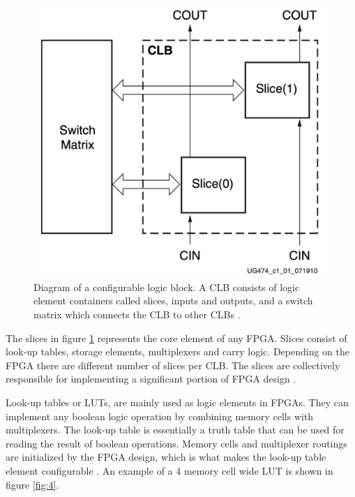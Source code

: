 \documentclass[12pt]{report}
\begin{document}
\begin{figure}[h]
    \centering
    \includegraphics[scale=0.25]{figures/clb.png}
    \caption{Diagram of a configurable logic block. A CLB consists of logic element containers called slices, inputs and outputs, and a switch matrix which connects the CLB to other CLBs \citep{XilClbMan}.}
    \label{fig:3}
\end{figure}

The slices in figure \ref{fig:3} represents the core element of any FPGA. Slices consist of look-up tables, storage elements, multiplexers and carry logic. Depending on the FPGA there are different number of slices per CLB. The slices are collectively responsible for implementing a significant portion of FPGA design \citep{XilClbMan}.

Look-up tables or LUTs, are mainly used as logic elements in FPGAs. They can implement any boolean logic operation by combining memory cells with multiplexers. The look-up table is essentially a truth table that can be used for reading the result of boolean operations. Memory cells and multiplexer routings are initialized by the FPGA design, which is what makes the look-up table element configurable \citep{XilFPGAIntro}. An example of a 4 memory cell wide LUT is shown in figure \ref{fig:4}.
\end{document}

